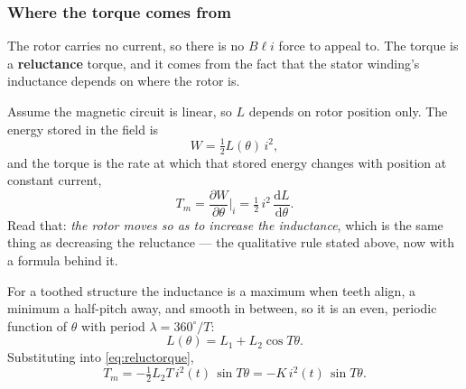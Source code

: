 \documentclass[11pt,a4paper]{article}
\begin{document}
\subsubsection{Where the torque comes from}

The rotor carries no current, so there is no $B\ell i$ force to appeal to. The
torque is a \textbf{reluctance} torque, and it comes from the fact that the
stator winding's inductance depends on where the rotor is.

Assume the magnetic circuit is linear, so $L$ depends on rotor position only.
The energy stored in the field is
\[
  W=\tfrac{1}{2}L(\theta)\,i^{2},
\]
and the torque is the rate at which that stored energy changes with position at
constant current,
\begin{equation}
  T_{m}=\frac{\partial W}{\partial\theta}\bigg|_{i}
       =\tfrac{1}{2}\,i^{2}\,\frac{\mathrm{d}L}{\mathrm{d}\theta} .
  \label{eq:reluctorque}
\end{equation}
Read that: \emph{the rotor moves so as to increase the inductance}, which is
the same thing as decreasing the reluctance --- the qualitative rule stated
above, now with a formula behind it.

For a toothed structure the inductance is a maximum when teeth align, a minimum
a half-pitch away, and smooth in between, so it is an even, periodic function
of $\theta$ with period $\lambda=360^\circ/T$:
\[
  L(\theta)=L_{1}+L_{2}\cos T\theta .
\]
Substituting into \eqref{eq:reluctorque},
\begin{equation}
  T_{m}=-\tfrac{1}{2}L_{2}T\,i^{2}(t)\,\sin T\theta
       =-K\,i^{2}(t)\,\sin T\theta .
  \label{eq:steptorque}
\end{equation}
\end{document}
